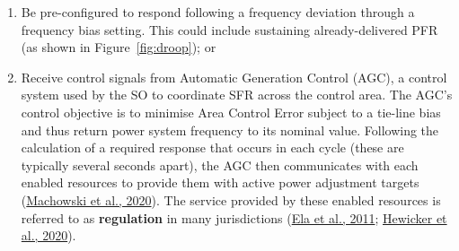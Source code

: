 \documentclass[12pt,a4paper,]{report}
\providecommand{\tightlist}{%
  \setlength{\itemsep}{0pt}\setlength{\parskip}{0pt}}
\begin{document}
\begin{enumerate}
\def\labelenumi{\arabic{enumi}.}
\tightlist
\item
  Be pre-configured to respond following a frequency deviation through a
  frequency bias setting. This could include sustaining
  already-delivered PFR (as shown in Figure~\ref{fig:droop}); or
\item
  Receive control signals from Automatic Generation Control (AGC), a
  control system used by the SO to coordinate SFR across the control
  area. The AGC's control objective is to minimise Area Control Error
  subject to a tie-line bias and thus return power system frequency to
  its nominal value. Following the calculation of a required response
  that occurs in each cycle (these are typically several seconds apart),
  the AGC then communicates with each enabled resources to provide them
  with active power adjustment targets
  (\protect\hyperlink{ref-machowskiPowerSystemDynamics2020}{Machowski et
  al., 2020}). The service provided by these enabled resources is
  referred to as \textbf{regulation} in many jurisdictions
  (\protect\hyperlink{ref-elaOperatingReservesVariable2011}{Ela et al.,
  2011};
  \protect\hyperlink{ref-hewickerDimensioningControlReserves2020}{Hewicker
  et al., 2020}).
\end{enumerate}
\end{document}

